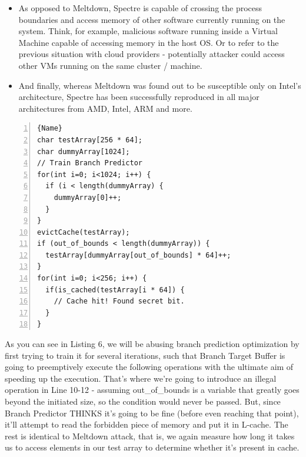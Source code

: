 \documentclass{article}
\begin{document}
\begin{itemize}
  \item As opposed to Meltdown, Spectre is capable of crossing the process boundaries and access memory of other software currently running on the system. Think, for example, malicious software running inside a Virtual Machine capable of accessing memory in the host OS. Or to refer to the previous situation with cloud providers - potentially attacker could access other VMs running on the same cluster / machine.
  \item And finally, whereas Meltdown was found out to be susceptible only on Intel's architecture, Spectre has been successfully reproduced in all major architectures from AMD, Intel, ARM and more. 
\end{itemize}

\begin{lstlisting}[caption=Spectre PoC,frame=tlrb, numbers=left, firstnumber=1]{Name}
char testArray[256 * 64];
char dummyArray[1024];
// Train Branch Predictor
for(int i=0; i<1024; i++) {
  if (i < length(dummyArray) {
    dummyArray[0]++;
  }
}
evictCache(testArray);
if (out_of_bounds < length(dummyArray)) {
  testArray[dummyArray[out_of_bounds] * 64]++;
}
for(int i=0; i<256; i++) {
  if(is_cached(testArray[i * 64]) {
    // Cache hit! Found secret bit.
  }
}
\end{lstlisting}

As you can see in Listing 6, we will be abusing branch prediction optimization by first trying to train it for several iterations, such that Branch Target Buffer is going to preemptively execute the following operations with the ultimate aim of speeding up the execution. That's where we're going to introduce an illegal operation in Line 10-12 - assuming out\_of\_bounds is a variable that greatly goes beyond the initiated size, so the condition would never be passed. But, since Branch Predictor THINKS it's going to be fine (before even reaching that point), it'll attempt to read the forbidden piece of memory and put it in L-cache. The rest is identical to Meltdown attack, that is, we again measure how long it takes us to access elements in our test array to determine whether it's present in cache.
\end{document}
